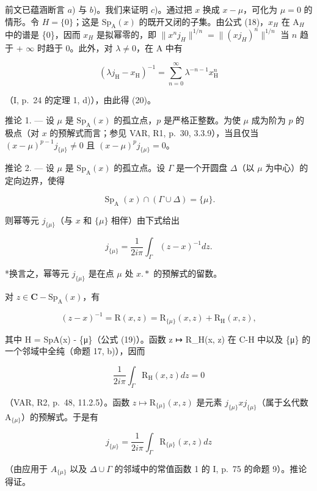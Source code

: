 前文已蕴涵断言 \(a\)) 与 \(b\))。我们来证明 \(c\))。通过把 \(x\) 换成 \(x-\mu\)，可化为 \(\mu=0\) 的情形。令 \(H = \{0\}\)；这是 \(\mathrm{Sp}_{\mathrm{A}}(x)\) 的既开又闭的子集。由公式 (18)，\(x_{H}\) 在 \(\mathrm{A}_{H}\) 中的谱是 \{0\}，因而 \(x_{H}\) 是拟幂零的，即 \(\|x^{n}j_{H}\|^{1/n}=\|(xj_{H})^{n}\|^{1/n}\) 当 \(n\) 趋于 + \(\infty\) 时趋于 0。此外，对 \(\lambda\neq0\)，在 A 中有

\[
\left(\lambda j _ {\mathrm{H}} - x _ {\mathrm{H}}\right) ^ {- 1} = \sum_ {n = 0} ^ {\infty} \lambda^ {- n - 1} x _ {\mathrm{H}} ^ {n}
\]

（I, p.~24 的定理 1, d)），由此得 (20)。

推论 1. --- 设 \(\mu\) 是 \(\mathrm{Sp}_{\mathrm{A}}(x)\) 的孤立点，\(p\) 是严格正整数。为使 \(\mu\) 成为阶为 \(p\) 的极点（对 \(x\) 的预解式而言；参见 VAR, R1, p.~30, 3.3.9），当且仅当 \((x - \mu)^{p-1} j_{\{\mu\}} \neq 0\) 且 \((x - \mu)^{p} j_{\{\mu\}} = 0\)。

推论 2. --- 设 \(\mu\) 是 \(\mathrm{Sp}_{\mathrm{A}}(x)\) 的孤立点。设 \(\Gamma\) 是一个开圆盘 \(\Delta\)（以 \(\mu\) 为中心）的定向边界，使得

\[
\operatorname{Sp} _ {\mathrm{A}} (x) \cap (\Gamma \cup \Delta) = \{\mu \}.
\]

则幂等元 \(j_{\{\mu \}}\)（与 \(x\) 和 \(\{\mu\}\) 相伴）由下式给出

\[
j _ {\{\mu \}} = \frac {1}{2 i \pi} \int_ {\Gamma} (z - x) ^ {- 1} d z.
\]

*换言之，幂等元 \(j_{\{\mu\}}\) 是在点 \(\mu\) 处 \(x.*\) 的预解式的留数。

对 \(z\in \mathbf{C} - \mathrm{Sp}_{\mathrm{A}}(x)\)，有

\[
(z - x) ^ {- 1} = \mathrm{R} (x, z) = \mathrm{R} _ {\{\mu \}} (x, z) + \mathrm{R} _ {\mathrm{H}} (x, z),
\]

其中 H = SpA(x) - \{μ\}（公式 (19)）。函数 z ↦ R\_H(x, z) 在 C-H 中以及 \{μ\} 的一个邻域中全纯（命题 17, b)），因而

\[
\frac {1}{2 i \pi} \int_ {\Gamma} \mathrm{R} _ {\mathrm{H}} (x, z) d z = 0
\]

（VAR, R2, p.~48, 11.2.5）。函数 \(z \mapsto \mathrm{R}_{\{\mu\}}(x,z)\) 是元素 \(j_{\{\mu\}}xj_{\{\mu\}}\)（属于幺代数 \(\mathrm{A}_{\{\mu\}}\)）的预解式。于是有

\[
j _ {\{\mu \}} = \frac {1}{2 i \pi} \int_ {\Gamma} \mathrm{R} _ {\{\mu \}} (x, z) d z
\]

（由应用于 \(A_{\{\mu\}}\) 以及 \(\Delta \cup \Gamma\) 的邻域中的常值函数 1 的 I, p.~75 的命题 9）。推论得证。


